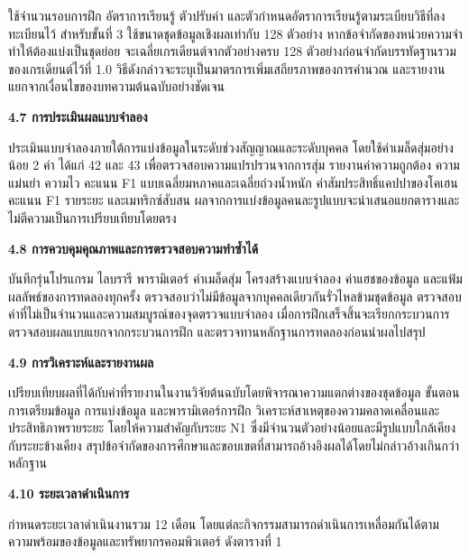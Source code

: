 \documentclass[12pt,a4paper]{article}
\newcommand{\subsectionthai}[1]{%
  \par\vspace{0.35\baselineskip}%
  \noindent\textbf{#1}\par\nobreak\vspace{0.1\baselineskip}%
}
\begin{document}
ใช้จำนวนรอบการฝึก อัตราการเรียนรู้ ตัวปรับค่า และตัวกำหนดอัตราการเรียนรู้ตามระเบียบวิธีที่ลงทะเบียนไว้ สำหรับขั้นที่ 3 ใช้ขนาดชุดข้อมูลเชิงผลเท่ากับ 128 ตัวอย่าง หากข้อจำกัดของหน่วยความจำทำให้ต้องแบ่งเป็นชุดย่อย จะเฉลี่ยเกรเดียนต์จากตัวอย่างครบ 128 ตัวอย่างก่อนจำกัดบรรทัดฐานรวมของเกรเดียนต์ไว้ที่ 1.0 วิธีดังกล่าวจะระบุเป็นมาตรการเพิ่มเสถียรภาพของการคำนวณ และรายงานแยกจากเงื่อนไขของบทความต้นฉบับอย่างชัดเจน

\subsectionthai{4.7 การประเมินผลแบบจำลอง}

ประเมินแบบจำลองภายใต้การแบ่งข้อมูลในระดับช่วงสัญญาณและระดับบุคคล โดยใช้ค่าเมล็ดสุ่มอย่างน้อย 2 ค่า ได้แก่ 42 และ 43 เพื่อตรวจสอบความแปรปรวนจากการสุ่ม รายงานค่าความถูกต้อง ความแม่นยำ ความไว คะแนน F1 แบบเฉลี่ยมหภาคและเฉลี่ยถ่วงน้ำหนัก ค่าสัมประสิทธิ์แคปปาของโคเฮน คะแนน F1 รายระยะ และเมทริกซ์สับสน ผลจากการแบ่งข้อมูลคนละรูปแบบจะนำเสนอแยกตารางและไม่ตีความเป็นการเปรียบเทียบโดยตรง

\subsectionthai{4.8 การควบคุมคุณภาพและการตรวจสอบความทำซ้ำได้}

บันทึกรุ่นโปรแกรม ไลบรารี พารามิเตอร์ ค่าเมล็ดสุ่ม โครงสร้างแบบจำลอง ค่าแฮชของข้อมูล และแฟ้มผลลัพธ์ของการทดลองทุกครั้ง ตรวจสอบว่าไม่มีข้อมูลจากบุคคลเดียวกันรั่วไหลข้ามชุดข้อมูล ตรวจสอบค่าที่ไม่เป็นจำนวนและความสมบูรณ์ของจุดตรวจแบบจำลอง เมื่อการฝึกเสร็จสิ้นจะเรียกกระบวนการตรวจสอบผลแบบแยกจากกระบวนการฝึก และตรวจทานหลักฐานการทดลองก่อนนำผลไปสรุป

\subsectionthai{4.9 การวิเคราะห์และรายงานผล}

เปรียบเทียบผลที่ได้กับค่าที่รายงานในงานวิจัยต้นฉบับโดยพิจารณาความแตกต่างของชุดข้อมูล ขั้นตอนการเตรียมข้อมูล การแบ่งข้อมูล และพารามิเตอร์การฝึก วิเคราะห์สาเหตุของความคลาดเคลื่อนและประสิทธิภาพรายระยะ โดยให้ความสำคัญกับระยะ N1 ซึ่งมีจำนวนตัวอย่างน้อยและมีรูปแบบใกล้เคียงกับระยะข้างเคียง สรุปข้อจำกัดของการศึกษาและขอบเขตที่สามารถอ้างอิงผลได้โดยไม่กล่าวอ้างเกินกว่าหลักฐาน

\subsectionthai{4.10 ระยะเวลาดำเนินการ}

กำหนดระยะเวลาดำเนินงานรวม 12 เดือน โดยแต่ละกิจกรรมสามารถดำเนินการเหลื่อมกันได้ตามความพร้อมของข้อมูลและทรัพยากรคอมพิวเตอร์ ดังตารางที่ 1
\end{document}
